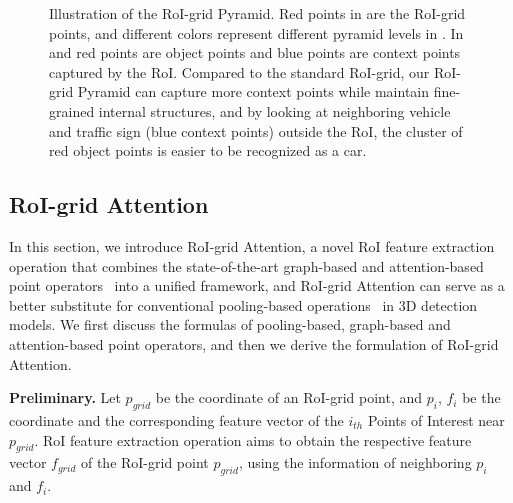 \documentclass[10pt,twocolumn,letterpaper]{article}
\begin{document}
\begin{figure}[!t] \centering   
{}    
\caption{Illustration of the RoI-grid Pyramid. Red points in  are the RoI-grid points, and different colors represent different pyramid levels in . In  and  red points are object points and blue points are context points captured by the RoI. Compared to the standard RoI-grid, our RoI-grid Pyramid can capture more context points while maintain fine-grained internal structures, and by looking at neighboring vehicle and traffic sign (blue context points) outside the RoI, the cluster of red object points is easier to be recognized as a car.}     
\label{fig_pyramid} 
\vspace{-4mm}
\end{figure}


\subsection{RoI-grid Attention} \label{RoI-grid Attention}
In this section, we introduce RoI-grid Attention, a novel RoI feature extraction operation that combines the state-of-the-art graph-based and attention-based point operators~\cite{wang2019dynamic, vaswani2017attention, zhao2020point} into a unified framework, and RoI-grid Attention can serve as a better substitute for conventional pooling-based operations~\cite{shi2020pv, deng2020voxel, shi2021pv} in 3D detection models. We first discuss the formulas of pooling-based, graph-based and attention-based point operators, and then we derive the formulation of RoI-grid Attention.

\textbf{Preliminary.} Let $p_{grid}$ be the coordinate of an RoI-grid point, and $p_{i}$, $f_{i}$ be the coordinate and the corresponding feature vector of the $i_{th}$ Points of Interest near $p_{grid}$. RoI feature extraction operation aims to obtain the respective feature vector $f_{grid}$ of the RoI-grid point $p_{grid}$, using the information of neighboring $p_{i}$ and $f_{i}$. 
\end{document}
